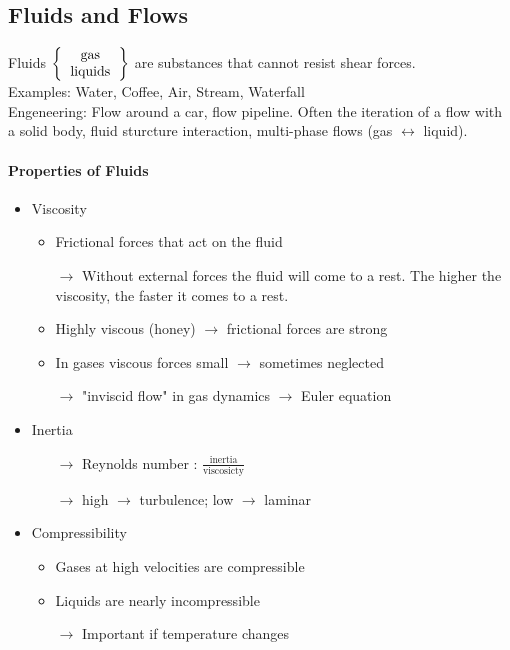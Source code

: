 \documentclass[a4paper,11pt]{scrartcl}
\begin{document}
  
\subsection{Fluids and Flows}

Fluids $\left\{
\begin{tabular}{c}
    gas \\
    liquids
\end{tabular}
\right\}$ are substances that cannot resist shear forces. \\
Examples: Water, Coffee, Air, Stream, Waterfall\\
Engeneering: Flow around a car, flow pipeline. Often the iteration of a flow with a solid body, fluid sturcture interaction, multi-phase flows (gas $\leftrightarrow$ liquid).

\paragraph{Properties of Fluids}
\begin{itemize}
	\item Viscosity
	\begin{itemize}
		\item Frictional forces that act on the fluid
		\item[$\rightarrow$] Without external forces the fluid will come to a rest. The higher the viscosity, the faster it comes to a rest.
		\item Highly viscous (honey) $\rightarrow$ frictional forces are strong
		\item In gases viscous forces small $\rightarrow$ sometimes neglected
		\item[$\rightarrow$] "inviscid flow" in gas dynamics $\rightarrow$ Euler equation
	\end{itemize}
	\item Inertia
	\begin{itemize}
		\item[$\rightarrow$] Reynolds number : $\frac{\text{inertia}}{\text{viscosicty}}$
		\item[$\rightarrow$] high $\rightarrow$ turbulence; low $\rightarrow$ laminar
	\end{itemize}
	\item Compressibility
	\begin{itemize}
		\item Gases at high velocities are compressible
		\item Liquids are nearly incompressible
		\item[$\rightarrow$] Important if temperature changes
	\end{itemize}
\end{itemize}
\end{document}
